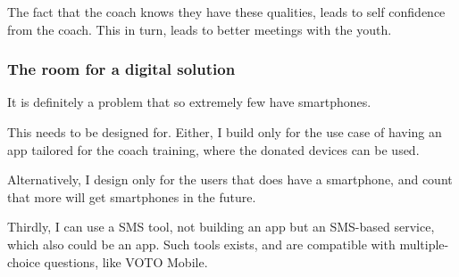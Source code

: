 The fact that the coach knows they have these qualities, leads to self confidence from the coach. This in turn, leads to better meetings with the youth.

\subsubsection{The room for a digital solution}

It is definitely a problem that so extremely few have smartphones.

This needs to be designed for. Either, I build only for the use case of having an app tailored for the coach training, where the donated devices can be used.

Alternatively, I design only for the users that does have a smartphone, and count that more will get smartphones in the future.

Thirdly, I can use a SMS tool, not building an app but an SMS-based service, which also could be an app. Such tools exists, and are compatible with multiple-choice questions, like VOTO Mobile.
